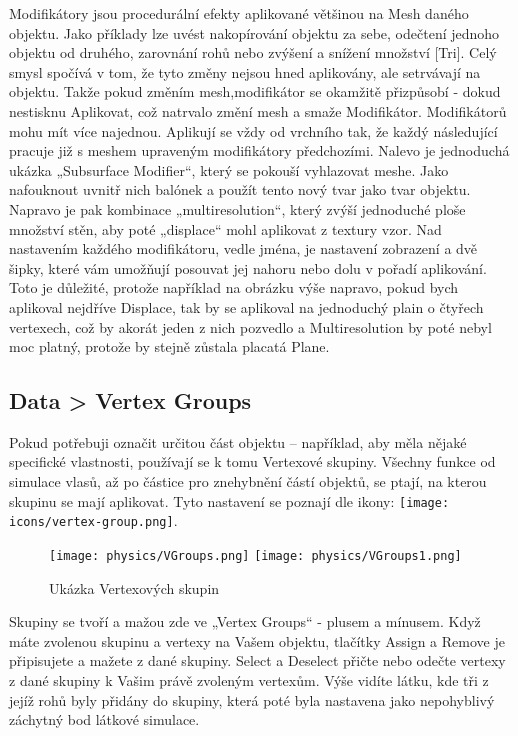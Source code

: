 \documentclass[12pt,a4paper]{report}
\begin{document}
	Modifikátory jsou procedurální efekty aplikované většinou na Mesh
	daného objektu. Jako příklady lze uvést nakopírování objektu za sebe,
	odečtení jednoho objektu od druhého, zarovnání rohů nebo zvýšení
	a snížení množství [Tri]. Celý smysl spočívá v tom, že tyto změny nejsou
	hned aplikovány, ale setrvávají na objektu. Takže pokud změním mesh,modifikátor se okamžitě přizpůsobí - dokud nestisknu Aplikovat, což
	natrvalo změní mesh a smaže Modifikátor. Modifikátorů mohu mít více
	najednou. Aplikují se vždy od vrchního tak, že každý následující pracuje
	již s meshem upraveným modifikátory předchozími.
	Nalevo je jednoduchá ukázka „Subsurface Modifier“, který se pokouší
	vyhlazovat meshe. Jako nafouknout uvnitř nich balónek a použít tento
	nový tvar jako tvar objektu. Napravo je pak kombinace „multiresolution“,
	který zvýší jednoduché ploše množství stěn, aby poté „displace“ mohl
	aplikovat z textury vzor.
	Nad nastavením každého modifikátoru, vedle jména, je nastavení
	zobrazení a dvě šipky, které vám umožňují posouvat jej nahoru nebo dolu
	v pořadí aplikování. Toto je důležité, protože například na obrázku výše
	napravo, pokud bych aplikoval nejdříve Displace, tak by se aplikoval na
	jednoduchý plain o čtyřech vertexech, což by akorát jeden z nich pozvedlo
	a Multiresolution by poté nebyl moc platný, protože by stejně zůstala
	placatá Plane.
	
	\subsection{Data > Vertex Groups}
	Pokud potřebuji označit určitou část objektu – například, aby měla nějaké
	specifické vlastnosti, používají se k tomu Vertexové skupiny. Všechny
	funkce od simulace vlasů, až po částice pro znehybnění částí objektů, se
	ptají, na kterou skupinu se mají aplikovat. Tyto nastavení se poznají dle
ikony:
\texttt{[image: icons/vertex-group.png]}.
	
	\begin{figure}[h]
		\centering
		\texttt{[image: physics/VGroups.png]}
		\texttt{[image: physics/VGroups1.png]}
		\caption{Ukázka Vertexových skupin}
		\label{pic:vertex-groups}
	\end{figure}
	
	Skupiny se tvoří a mažou zde ve „Vertex Groups“ - plusem a mínusem.
	Když máte zvolenou skupinu a vertexy na Vašem objektu, tlačítky Assign
	a Remove je připisujete a mažete z dané skupiny. Select a Deselect přičte
	nebo odečte vertexy z dané skupiny k Vašim právě zvoleným vertexům.
	Výše vidíte látku, kde tři z jejíž rohů byly přidány do skupiny, která poté
	byla nastavena jako nepohyblivý záchytný bod látkové simulace.
	
\end{document}
